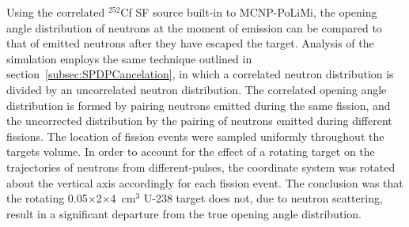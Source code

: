 Using the correlated $^{252}$Cf SF source built-in to MCNP-PoLiMi, the opening angle distribution of neutrons at the moment of emission can be compared to that of emitted neutrons after they have escaped the target.
Analysis of the simulation employs the same technique outlined in section~\ref{subsec:SPDPCancelation}, in which a correlated neutron distribution is divided by an uncorrelated neutron distribution.
The correlated opening angle distribution is formed by pairing neutrons emitted during the same fission, and the uncorrected distribution by the pairing of neutrons emitted during different fissions.
The location of fission events were sampled uniformly throughout the targets volume.
In order to account for the effect of a rotating target on the trajectories of neutrons from different-pulses, the coordinate system was rotated about the vertical axis accordingly for each fission event.
The conclusion was that the rotating 0.05$\times$2$\times$4~cm$^3$ U-238 target does not, due to neutron scattering, result in a significant departure from the true opening angle distribution.

